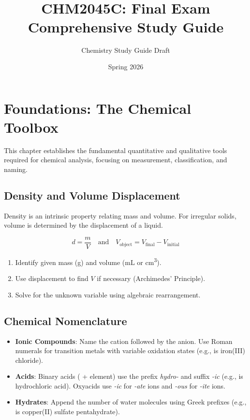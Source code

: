 \documentclass[11pt]{article}
\begin{document}
\title{CHM2045C: Final Exam Comprehensive Study Guide}
\author{Chemistry Study Guide Draft}
\date{Spring 2026}
\maketitle

\section{Foundations: The Chemical Toolbox}

This chapter establishes the fundamental quantitative and qualitative tools required for chemical analysis, focusing on measurement, classification, and naming.

\subsection{Density and Volume Displacement}
Density is an intrinsic property relating mass and volume. For irregular solids, volume is determined by the displacement of a liquid.
\begin{tcolorbox}[memorize]
    \[ d = \frac{m}{V} \quad \text{and} \quad V_{\text{object}} = V_{\text{final}} - V_{\text{initial}} \]
\end{tcolorbox}
\begin{enumerate}
    \item Identify given mass (\si{g}) and volume (\si{mL} or \si{cm^3}).
    \item Use displacement to find $V$ if necessary (Archimedes' Principle).
    \item Solve for the unknown variable using algebraic rearrangement.
\end{enumerate}

\subsection{Chemical Nomenclature}
\begin{itemize}
    \item \textbf{Ionic Compounds}: Name the cation followed by the anion. Use Roman numerals for transition metals with variable oxidation states (e.g.,  is iron(III) chloride).
    \item \textbf{Acids}: Binary acids ( + element) use the prefix \textit{hydro-} and suffix \textit{-ic} (e.g.,  is hydrochloric acid). Oxyacids use \textit{-ic} for \textit{-ate} ions and \textit{-ous} for \textit{-ite} ions.
    \item \textbf{Hydrates}: Append the number of water molecules using Greek prefixes (e.g.,  is copper(II) sulfate pentahydrate).
\end{itemize}
\end{document}
